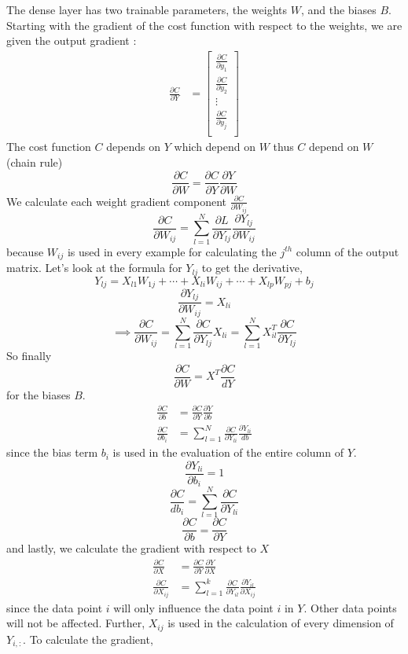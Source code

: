 \documentclass[a4paper, twocolumn, twoside]{article}
\begin{document}
	The dense layer has two trainable parameters, the weights $W$, and the biases $B$.
	Starting with the gradient of the cost function with respect to the weights, we are given
	the output gradient :
	\begin{align}
		\frac{\partial C}{\partial Y} &= \begin{bmatrix}
		\frac{\partial C}{\partial y_1} \\
		\frac{\partial C}{\partial y_2} \\
        \vdots \\
	   \frac{\partial C}{\partial y_j} \\
	\end{bmatrix}
	\end{align}
	The cost function $C$ depends on $Y$ which depend on $W$ thus $C$ depend on $W$ (chain rule)
	$$
    \frac{\partial C}{\partial W} = \frac{\partial C}{\partial Y} \frac{\partial Y}{\partial W}
	$$
	We calculate each weight gradient component $\frac{\partial C }{\partial W_{ij}}$
	$$
    \frac{\partial C}{\partial W_{ij}} = \sum_{l=1}^{N} \frac{\partial L}{\partial Y_{lj}} \frac{\partial Y_{lj}}{\partial W_{ij}}
	$$
	because $W_{ij}$ is used in every example for calculating the $j^{th}$ column of the output matrix. Let's look at the formula for $Y_{lj}$ to get the derivative,
	$$
		Y_{lj} = X_{l1}W_{1j} + \cdots + X_{li}W_{ij} + \cdots + X_{lp}W_{pj} + b_{j}
	$$
	$$
		\frac{\partial Y_{lj}}{\partial W_{ij}} = X_{li}
	$$
	$$
		\implies \frac{\partial C}{\partial W_{ij}} = \sum_{l=1}^{N} \frac{\partial C}{\partial Y_{lj}} X_{li} = \sum_{l=1}^{N} X^{T}_{il}\frac{\partial C}{\partial Y_{lj}}
	$$
	So finally 
	$$
		\frac{\partial C}{\partial W} = X^{T} \frac{\partial C}{dY}
	$$
	for the biases $B$.
	\begin{align}
		\frac{\partial C}{\partial b} &= \frac{\partial C}{\partial Y} \frac{\partial Y}{\partial b}\\
		\frac{\partial C}{\partial b_{i}} &= \sum_{l=1}^{N} \frac{\partial C}{\partial Y_{li}} \frac{\partial Y_{li}}{db}
	\end{align}
	since the bias term $b_{i}$ is used in the evaluation of the entire column of $Y$.
	$$
		\frac{\partial Y_{li}}{\partial b_{i}} = 1
	$$
	$$
		\frac{\partial C}{db_{i}} = \sum_{l=1}^{N} \frac{\partial C}{\partial Y_{li}}
	$$
	$$
		\frac{\partial C}{\partial b} = \frac{\partial C}{\partial Y}
	$$
	and lastly, we calculate the gradient with respect to $X$
	\begin{align}
		\frac{\partial C}{\partial X} &= \frac{\partial C}{\partial Y} \frac{\partial Y}{\partial X}\\
		\frac{\partial C}{\partial X_{ij}} &= \sum_{l=1}^{k} \frac{\partial C}{\partial Y_{il}} \frac{\partial Y_{il}}{\partial X_{ij}}
	\end{align}
	since the data point $i$ will only influence the data point $i$ in $Y$. Other data points will not be affected. Further, $X_{ij}$ is used in the calculation of every dimension of $Y_{i,:}$. To calculate the gradient,
\end{document}
